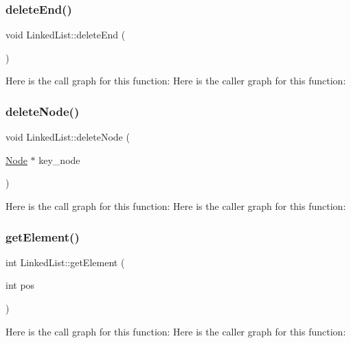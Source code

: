 \subsubsection{\texorpdfstring{delete\+End()}{deleteEnd()}}
{\footnotesize\ttfamily void Linked\+List\+::delete\+End (\begin{DoxyParamCaption}{ }\end{DoxyParamCaption})}

Here is the call graph for this function\+:
Here is the caller graph for this function\+:
\mbox{\label{class_linked_list_a9a53a4d26d1c757f3d526db3fa43c2f8}} 
\subsubsection{\texorpdfstring{delete\+Node()}{deleteNode()}}
{\footnotesize\ttfamily void Linked\+List\+::delete\+Node (\begin{DoxyParamCaption}\item[{\hyperlink{class_node}{Node} $\ast$}]{key\+\_\+node }\end{DoxyParamCaption})}

Here is the call graph for this function\+:
Here is the caller graph for this function\+:
\mbox{\label{class_linked_list_a2866982bfe5f87a2a265d1e2ec3e43ed}} 
\subsubsection{\texorpdfstring{get\+Element()}{getElement()}}
{\footnotesize\ttfamily int Linked\+List\+::get\+Element (\begin{DoxyParamCaption}\item[{int}]{pos }\end{DoxyParamCaption})}

Here is the call graph for this function\+:
Here is the caller graph for this function\+:
\mbox{\label{class_linked_list_a744fc291de7eff0b934e7b594449fa10}} 
